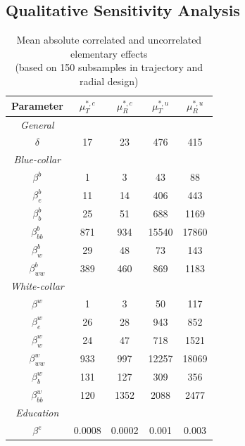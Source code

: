 \documentclass[a4paper,12pt]{article}
\begin{document}
\subsection{Qualitative Sensitivity Analysis}
\newpage
\setlength{\tabcolsep}{22pt} %
\begin{table}[H] 
	\centering
	\begin{threeparttable}
		\caption[Model Parametrization]{Mean absolute correlated and uncorrelated elementary effects\\ (based on 150 subsamples in trajectory and radial design)}
		\label{tab:params}
		\renewcommand{\arraystretch}{1.2}%
		\begin{tabular}{cS[table-format=3.2]S[table-format=3.2]@{\hskip 0.7in}|@{\hskip 0.5in}S[table-format=3.2]S[table-format=3.2]}

			{Parameter}     & {$\mu^{*,c}_T$}   & {$\mu^{*,c}_R$} & {$\mu^{*,u}_T$} & {$\mu^{*,u}_R$}\\ \midrule
			\textit{General} \\
			$\delta$ & 17   & 23 & 476 & 415   \\    \midrule
			\textit{Blue-collar}\\    
			$\beta^b$ & 1   & 3            & 43 & 88    \\
			$\beta_e^b$ & 11  &    14        & 406  & 443    \\
			$\beta^b_b$ & 25  & 51            & 688  & 1169    \\
			$\beta^b_{bb}$ & 871 & 934           & 15540  & 17860     \\
			$\beta^b_w$ & 29    & 48             & 73  &  143  \\
			$\beta^b_{ww}$ & 389    & 460           & 869 &  1183    \\ \midrule
			\textit{White-collar}\\
			$\beta^w$ & 1   & 3            & 50 &  117   \\
			$\beta^w_e$ & 26   & 28          & 943 &  852    \\
			$\beta^w_w$ & 24  & 47            & 718 &  1521   \\
			$\beta^w_{ww}$ & 933  & 997           & 12257 & 18069   \\
			$\beta^w_b$ & 131 & 127           & 309 &  356   \\
			$\beta^w_{bb}$ & 120 & 1352         & 2088 &  2477   \\ \midrule
			\textit{Education} \\
			$\beta^e$     & 0.0008    & 0.0002              & 0.001&  0.003   \\

\end{tabular}
\end{threeparttable}
\end{table}
\end{document}
